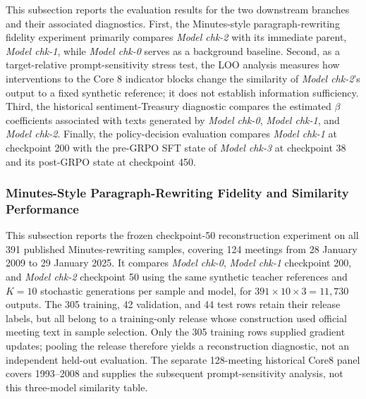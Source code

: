 This subsection reports the evaluation results for the two downstream branches and their associated diagnostics. First, the Minutes-style paragraph-rewriting fidelity experiment primarily compares \textit{Model chk-2} with its immediate parent, \textit{Model chk-1}, while \textit{Model chk-0} serves as a background baseline. Second, as a target-relative prompt-sensitivity stress test, the LOO analysis measures how interventions to the Core 8 indicator blocks change the similarity of \textit{Model chk-2}'s output to a fixed synthetic reference; it does not establish information sufficiency. Third, the historical sentiment-Treasury diagnostic compares the estimated $\beta$ coefficients associated with texts generated by \textit{Model chk-0}, \textit{Model chk-1}, and \textit{Model chk-2}. Finally, the policy-decision evaluation compares \textit{Model chk-1} at checkpoint 200 with the pre-GRPO SFT state of \textit{Model chk-3} at checkpoint 38 and its post-GRPO state at checkpoint 450.



\subsubsection*{Minutes-Style Paragraph-Rewriting Fidelity and Similarity Performance}
This subsection reports the frozen checkpoint-50 reconstruction experiment on all 391 published Minutes-rewriting samples, covering 124 meetings from 28 January 2009 to 29 January 2025. It compares \textit{Model chk-0}, \textit{Model chk-1} checkpoint 200, and \textit{Model chk-2} checkpoint 50 using the same synthetic teacher references and \(K=10\) stochastic generations per sample and model, for \(391\times10\times3=11{,}730\) outputs. The 305 training, 42 validation, and 44 test rows retain their release labels, but all belong to a training-only release whose construction used official meeting text in sample selection. Only the 305 training rows supplied gradient updates; pooling the release therefore yields a reconstruction diagnostic, not an independent held-out evaluation. The separate 128-meeting historical Core8 panel covers 1993--2008 and supplies the subsequent prompt-sensitivity analysis, not this three-model similarity table.


